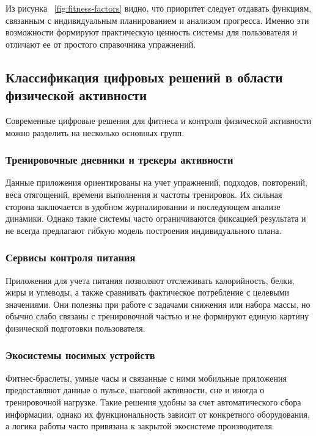 Из рисунка ~\ref{fig:fitness-factors} видно, что приоритет следует отдавать функциям, связанным с индивидуальным планированием и анализом прогресса. Именно эти возможности формируют практическую ценность системы для пользователя и отличают ее от простого справочника упражнений.

\subsection{Классификация цифровых решений в области физической активности}

Современные цифровые решения для фитнеса и контроля физической активности можно разделить на несколько основных групп.

\subsubsection{Тренировочные дневники и трекеры активности}

Данные приложения ориентированы на учет упражнений, подходов, повторений, веса отягощений, времени выполнения и частоты тренировок. Их сильная сторона заключается в удобном журналировании и последующем анализе динамики. Однако такие системы часто ограничиваются фиксацией результата и не всегда предлагают гибкую модель построения индивидуального плана.

\subsubsection{Сервисы контроля питания}

Приложения для учета питания позволяют отслеживать калорийность, белки, жиры и углеводы, а также сравнивать фактическое потребление с целевыми значениями. Они полезны при работе с задачами снижения или набора массы, но обычно слабо связаны с тренировочной частью и не формируют единую картину физической подготовки пользователя.

\subsubsection{Экосистемы носимых устройств}

Фитнес-браслеты, умные часы и связанные с ними мобильные приложения предоставляют данные о пульсе, шаговой активности, сне и иногда о тренировочной нагрузке. Такие решения удобны за счет автоматического сбора информации, однако их функциональность зависит от конкретного оборудования, а логика работы часто привязана к закрытой экосистеме производителя.

